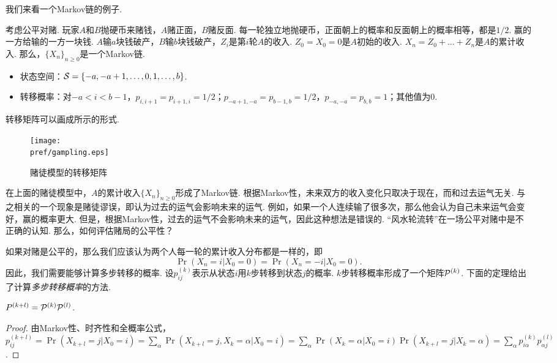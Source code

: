 我们来看一个Markov链的例子. 
\begin{example}[赌徒模型]
    考虑公平对赌. 玩家$A$和$B$抛硬币来赌钱，$A$赌正面，$B$赌反面. 每一轮独立地抛硬币，正面朝上的概率和反面朝上的概率相等，都是$1/2$. 赢的一方给输的一方一块钱. $A$输$a$块钱破产，$B$输$b$块钱破产，$Z_i$是第$i$轮$A$的收入. $Z_0=X_0=0$是$A$初始的收入. $X_n=Z_0+\dots+Z_n$是$A$的累计收入. 那么，$\{X_n\}_{n\geq 0}$是一个Markov链.
    \begin{itemize}
        \item 状态空间：$\MS=\{-a,-a+1,\dots,0,1,\dots,b\}$.
        \item 转移概率：对$-a<i<b-1$，$p_{i,i+1}=p_{i+1,i}=1/2$；$p_{-a+1,-a}=p_{b-1,b}=1/2$，$p_{-a,-a}=p_{b,b}=1$；其他值为$0$.
    \end{itemize}
    转移矩阵可以画成所示的形式.
    \begin{figure}[ht]
    \centering
    \texttt{[image: \\pref/gampling.eps]}
    \caption{赌徒模型的转移矩阵}\label{fig:gambling}
    \end{figure}
\end{example}

在上面的赌徒模型中，$A$的累计收入$\{X_n\}_{n\geq 0}$形成了Markov链. 根据Markov性，未来双方的收入变化只取决于现在，而和过去运气无关. 与之相关的一个现象是赌徒谬误，即认为过去的运气会影响未来的运气. 例如，如果一个人连续输了很多次，那么他会认为自己未来运气会变好，赢的概率更大. 但是，根据Markov性，过去的运气不会影响未来的运气，因此这种想法是错误的. ``风水轮流转''在一场公平对赌中是不正确的认知. 那么，如何评估赌局的公平性？

如果对赌是公平的，那么我们应该认为两个人每一轮的累计收入分布都是一样的，即
    \[\Pr(X_n=i|X_0=0)=\Pr(X_n=-i|X_0=0).\]
因此，我们需要能够计算多步转移的概率. 设$p_{ij}^{(k)}$表示从状态$i$用$k$步转移到状态$j$的概率. $k$步转移概率形成了一个矩阵$\P^{(k)}$. 下面的定理给出了计算\emph{多步转移概率}的方法.

\begin{theorem}\label{thm:kolmogorov-chapman}
    $P^{(k+l)}=\P^{(k)}\P^{(l)}$.
\end{theorem}

\begin{proof}
由Markov性、时齐性和全概率公式，$p_{ij}^{(k+l)}=\Pr(X_{k+l}=j|X_0=i)=\sum_{\alpha}\Pr(X_{k+l}=j,X_k=\alpha|X_0=i)=\sum_{\alpha}\Pr(X_k=\alpha|X_0=i)\Pr(X_{k+l}=j|X_k=\alpha)=\sum_{\alpha} p_{i\alpha}^{(k)}p_{\alpha j}^{(l)}$.
\end{proof}


